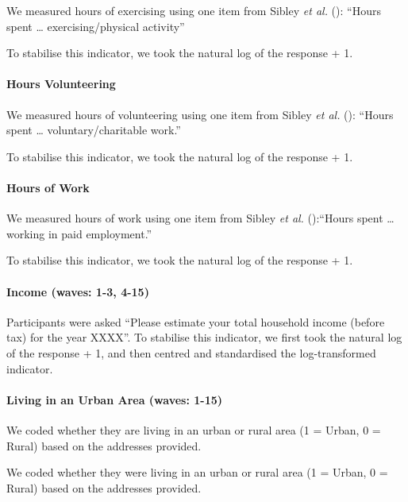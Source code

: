\documentclass[
  singlecolumn]{article}
\let\oldparagraph\paragraph
\renewcommand{\paragraph}[1]{\oldparagraph{#1}\mbox{}}
\begin{document}
We measured hours of exercising using one item from Sibley \emph{et al.}
(): ``Hours spent \ldots{}
exercising/physical activity''

To stabilise this indicator, we took the natural log of the response +
1.

\paragraph{Hours Volunteering}\label{hours-volunteering}

We measured hours of volunteering using one item from Sibley \emph{et
al.} (): ``Hours spent \ldots{}
voluntary/charitable work.''

To stabilise this indicator, we took the natural log of the response +
1.

\paragraph{Hours of Work}\label{hours-of-work}

We measured hours of work using one item from Sibley \emph{et al.}
():``Hours spent \ldots{} working in paid
employment.''

To stabilise this indicator, we took the natural log of the response +
1.

\paragraph{Income (waves: 1-3, 4-15)}\label{income-waves-1-3-4-15}

Participants were asked ``Please estimate your total household income
(before tax) for the year XXXX''. To stabilise this indicator, we first
took the natural log of the response + 1, and then centred and
standardised the log-transformed indicator.

\paragraph{Living in an Urban Area (waves:
1-15)}\label{living-in-an-urban-area-waves-1-15}

We coded whether they are living in an urban or rural area (1 = Urban, 0
= Rural) based on the addresses provided.

We coded whether they were living in an urban or rural area (1 = Urban,
0 = Rural) based on the addresses provided.
\end{document}
